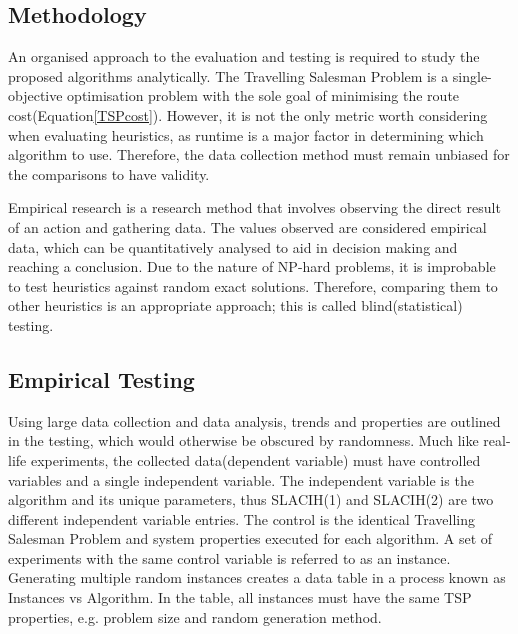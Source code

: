 \begin{center}
\section{Methodology}
\label{method}
\end{center}

An organised approach to the evaluation and testing is required to study the proposed algorithms analytically. The Travelling Salesman Problem is a single-objective optimisation problem\cite{Halim2021} with the sole goal of minimising the route cost(Equation\ref{TSPcost}). However, it is not the only metric worth considering when evaluating heuristics, as runtime is a major factor in determining which algorithm to use\cite{rardin2001experimental}. Therefore, the data collection method must remain unbiased for the comparisons to have validity.

Empirical research is a research method that involves observing the direct result of an action and gathering data\cite{patten2016proposing}. The values observed are considered empirical data, which can be quantitatively analysed to aid in decision making and reaching a conclusion\cite{patten2016proposing}. Due to the nature of NP-hard problems, it is improbable\cite{Halim2021} to test heuristics against random exact solutions. Therefore, comparing them to other heuristics is an appropriate approach; this is called blind(statistical) testing\cite{BHATTACHARJEE2022100471}.

\subsection{Empirical Testing}

Using large data collection and data analysis, trends and properties are outlined in the testing, which would otherwise be obscured by randomness\cite{BHATTACHARJEE2022100471}. Much like real-life experiments, the collected data(dependent variable) must have controlled variables and a single independent variable. The independent variable is the algorithm and its unique parameters, thus SLACIH(1) and SLACIH(2) are two different independent variable entries. The control is the identical Travelling Salesman Problem and system properties executed for each algorithm. A set of experiments with the same control variable is referred to as an instance. Generating multiple random instances creates a data table in a process known as Instances vs Algorithm\cite{BHATTACHARJEE2022100471}. In the table, all instances must have the same TSP properties, e.g. problem size and random generation method.

